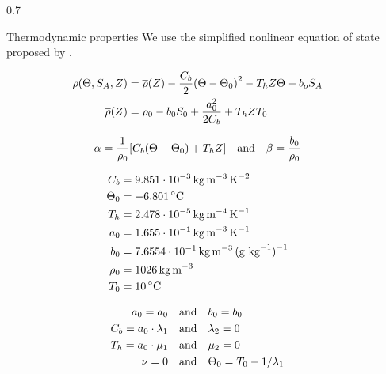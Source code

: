 \documentclass[final]{beamer}
\newlength{\sepwidth}
\newlength{\colwidth}
\newcommand{\separatorcolumn}{\begin{column}{\sepwidth}\end{column}}
\begin{document}
\begin{frame}[t]
\begin{columns}[t]
\separatorcolumn

\begin{column}{0.7\colwidth}
 
  \begin{alertblock}{Thermodynamic properties}
    We use the simplified nonlinear equation of state proposed
    by \citet{roquet_defining_2015}.

    \begin{align}
      \rho(\Theta, S_A, Z) &= \overline{\rho}(Z)
      - \frac{C_b}{2} \qty(\Theta - \Theta_0)^2
      - T_h Z \Theta
      + b_o S_A \\
      \overline{\rho}(Z) &= \rho_0 - b_0 S_0 + \frac{a_0^2}{2 C_b}
      + T_h Z T_0
    \end{align}

    \begin{align}
      \alpha = \frac{1}{\rho_0} \qty[C_b (\Theta - \Theta_0) + T_h Z]
      \qand
      \beta = \frac{b_0}{\rho_0}
    \end{align}
    
    \begin{align*}
        C_b &= 9.851 \cdot 10^{-3} \text{\,kg}\text{\,m}^{-3}\text{\,K}^{-2} \\
        \Theta_0 &= -6.801\text{\,}^\circ\text{C} \\
        T_h &= 2.478 \cdot 10^{-5} \text{\,kg}\text{\,m}^{-4}\text{\,K}^{-1}\\
        a_0 &= 1.655 \cdot 10^{-1} \text{\,kg\,m}^{-3}\text{\,K}^{-1} \\
        b_0 &= 7.6554 \cdot 10^{-1} \text{\,kg\,m}^{-3}\text{\,(g kg}^{-1}\text{)}^{-1} \\
        \rho_0 &= 1026 \text{\,kg\,m}^{-3} \\
        T_0 &= 10\text{\,}^\circ\text{C}
    \end{align*}

    \begin{align*}
      a_0 = a_0 &\qand
      b_0 = b_0 \\
      C_b = a_0 \cdot \lambda_1 &\qand
      \lambda_2 = 0 \\
      T_h = a_0 \cdot \mu_1 &\qand
      \mu_2 = 0 \\
      \nu = 0 &\qand \Theta_0 = T_0 - {1}/{\lambda_1}
    \end{align*}



\end{alertblock}
\end{column}
\end{columns}
\end{frame}
\end{document}
